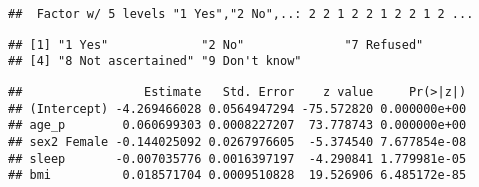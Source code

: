 \documentclass[]{article}
\newenvironment{Shaded}{\begin{snugshade}}{\end{snugshade}}
\newcommand{\KeywordTok}[1]{\textcolor[rgb]{0.13,0.29,0.53}{\textbf{#1}}}
\newcommand{\DataTypeTok}[1]{\textcolor[rgb]{0.13,0.29,0.53}{#1}}
\newcommand{\StringTok}[1]{\textcolor[rgb]{0.31,0.60,0.02}{#1}}
\newcommand{\CommentTok}[1]{\textcolor[rgb]{0.56,0.35,0.01}{\textit{#1}}}
\newcommand{\OperatorTok}[1]{\textcolor[rgb]{0.81,0.36,0.00}{\textbf{#1}}}
\newcommand{\NormalTok}[1]{#1}
\begin{document}
\begin{verbatim}
##  Factor w/ 5 levels "1 Yes","2 No",..: 2 2 1 2 2 1 2 2 1 2 ...
\end{verbatim}

\begin{Shaded}
\end{Shaded}

\begin{verbatim}
## [1] "1 Yes"             "2 No"              "7 Refused"        
## [4] "8 Not ascertained" "9 Don't know"
\end{verbatim}

\begin{Shaded}
\end{Shaded}

\begin{verbatim}
##                 Estimate   Std. Error    z value     Pr(>|z|)
## (Intercept) -4.269466028 0.0564947294 -75.572820 0.000000e+00
## age_p        0.060699303 0.0008227207  73.778743 0.000000e+00
## sex2 Female -0.144025092 0.0267976605  -5.374540 7.677854e-08
## sleep       -0.007035776 0.0016397197  -4.290841 1.779981e-05
## bmi          0.018571704 0.0009510828  19.526906 6.485172e-85
\end{verbatim}
\end{document}
